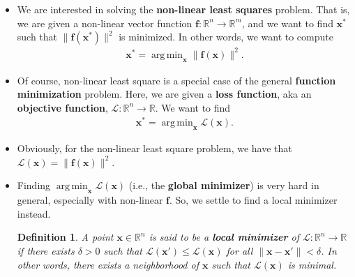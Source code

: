 \documentclass[10pt]{article}
\newtheorem{definition}[lemma]{Definition}
\newcommand{\ve}[1]{\mathbf{#1}}
\newcommand{\ra}{\rightarrow}
\newcommand{\mcal}[1]{\mathcal{#1}}
\newcommand{\Real}{\mathbb{R}}
\DeclareMathOperator*{\argmin}{arg\,min}
\begin{document}
\begin{itemize}
    \item We are interested in solving the {\bf non-linear least squares} problem. That is, we are given a non-linear vector function $\ve{f}: \Real^n \ra \Real^m$, and we want to find $\ve{x}^*$ such that $\| \ve{f}(\ve{x}^*) \|^2$ is minimized. In other words, we want to compute
    \begin{align*}
        \ve{x}^* = \argmin_{\ve{x}} \| \ve{f}(\ve{x}) \|^2.
    \end{align*}

    \item Of course, non-linear least square is a special case of the general {\bf function minimization} problem. Here, we are given a {\bf loss function}, aka an {\bf objective function}, $\mcal{L}: \Real^n \ra \Real$. We want to find
    \begin{align*}
        \ve{x}^* = \argmin_{\ve{x}} \mcal{L}(\ve{x}).
    \end{align*}

    \item Obviously, for the non-linear least square problem, we have that $\mcal{L}(\ve{x}) = \| \ve{f}(\ve{x}) \|^2$.
    
    \item Finding $\argmin_{\ve{x}} \mcal{L}(\ve{x})$ (i.e., the {\bf global minimizer}) is very hard in general, especially with non-linear $\ve{f}$. So, we settle to find a local minimizer instead.
    
    \begin{definition}
        A point $\ve{x} \in \Real^n$ is said to be a {\bf local minimizer} of $\mcal{L}: \Real^n \ra \Real$ if there exists $\delta > 0$ such that $\mcal{L}(\ve{x}') \leq \mcal{L}(\ve{x})$ for all $\| \ve{x} - \ve{x}' \| < \delta$. In other words, there exists a neighborhood of $\ve{x}$ such that $\mcal{L}(\ve{x})$ is minimal.
    \end{definition}


\end{itemize}
\end{document}
